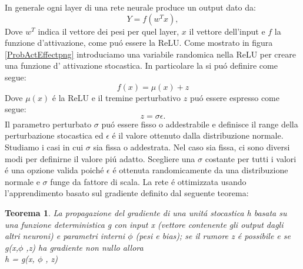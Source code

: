 \documentclass[a4paper,12pt]{report}
\begin{document}
 In generale ogni layer di una rete neurale produce un output dato da:
 \begin{equation} 
  Y = f\left(w^{T} x\right), 
 \end{equation} 
 Dove $w^{T}$ indica il vettore dei pesi per quel layer, $x$ il vettore dell'input e $f$ la funzione d'attivazione, come pu\'o  essere la ReLU. Come mostrato in figura \ref{ProbActEffectpng} introduciamo una variabile randomica nella ReLU per creare una funzione d' attivazione stocastica. In particolare la si pu\'o definire come segue:
 \begin{equation} 
  f\left(x\right) = \mu \left(x\right) + z
 \end{equation} 
 Dove $\mu\left(x\right)$ \'e la ReLU e il tremine perturbativo $z$ pu\'o essere espresso come segue:
 \begin{equation} 
  z = \sigma  \epsilon. 
 \end{equation} 
 Il parametro perturbato $\sigma$ pu\' o essere fisso o addestrabile e definisce il range della perturbazione stocastica ed $\epsilon$ \'e il valore ottenuto dalla distribuzione normale. Studiamo i casi in cui $\sigma$ sia fissa o addestrata. 
 Nel caso sia fissa, ci sono diversi modi per definirne il valore pi\'u adatto. Scegliere una $\sigma$ costante per tutti i valori \'e una opzione valida poich\'e $\epsilon$ \'e ottenuta randomicamente da una distribuzione normale e $\sigma$ funge da fattore di scala. La rete \'e ottimizzata usando l'apprendimento basato sul gradiente definito dal seguente teorema:
 \newtheorem{teorema}{Teorema}
 
 \begin{teorema} \label{GradienPropth}
  La propagazione del gradiente di una unit\'a stocastica h basata su una funzione deterministica g con input x (vettore contenente gli output dagli altri neuroni) e parametri interni $\phi$ (pesi e bias); se il rumore z \'e possibile e se g(x,$\phi$ ,z) ha gradiente non nullo allora\\
  
  \centering
  h = g(x, $\phi$ , z)
 \end{teorema}
\end{document}
